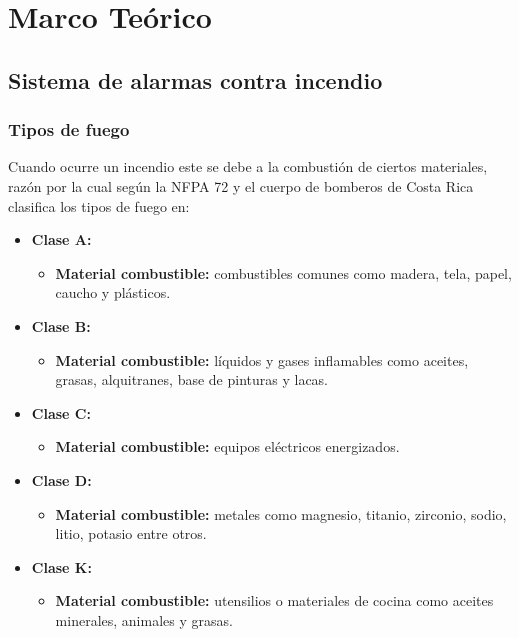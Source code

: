   \chapter{Marco Teórico} 
\label{C:antecedentes}

\section{Sistema de alarmas contra incendio}


\subsection{Tipos de fuego}

Cuando ocurre un incendio este se debe a la combustión de ciertos materiales, razón por la cual según la NFPA 72 y el cuerpo de bomberos de Costa Rica clasifica los tipos de fuego en: \cite{Bomberos}\\

\begin{itemize}
	
	\item \textbf{Clase A:} 
	
\begin{itemize}
	\item \textbf{Material combustible:} combustibles comunes como madera, tela, papel, caucho y plásticos.
\end{itemize}
	
	
	\item \textbf{Clase B:} 

\begin{itemize}
	\item \textbf{Material combustible:} líquidos y gases inflamables como aceites, grasas,
	alquitranes, base de pinturas y lacas.
\end{itemize}	


	\item \textbf{Clase C:} 

\begin{itemize}
	\item \textbf{Material combustible:} equipos eléctricos energizados.
\end{itemize}



	\item \textbf{Clase D:} 

\begin{itemize}
	\item \textbf{Material combustible:} metales como magnesio, titanio, zirconio, sodio, litio, potasio entre otros.
\end{itemize}

	\item \textbf{Clase K:} 

\begin{itemize}
	\item \textbf{Material combustible:} utensilios o materiales de cocina como aceites minerales, animales y grasas.
\end{itemize}

	
	
\end{itemize}


